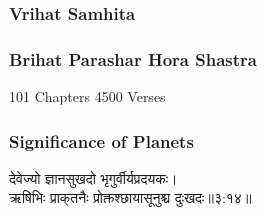 \subsubsection{Vrihat Samhita}
\subsubsection{Brihat Parashar Hora Shastra}
101 Chapters
4500 Verses
\subsubsection{Significance of Planets}
\begin{sanskrit}
	\begin{center}
		देवेज्यो ज्ञानसुखदो भृगुर्वीर्यप्रदयकः।\\ऋषिभिः प्राक्‌तनैः प्रोक्तश्छायासूनुश्च दुःखदः॥३:१४॥\cite{BrihatParasharHoraShastraVol1}
	\end{center}
\end{sanskrit}